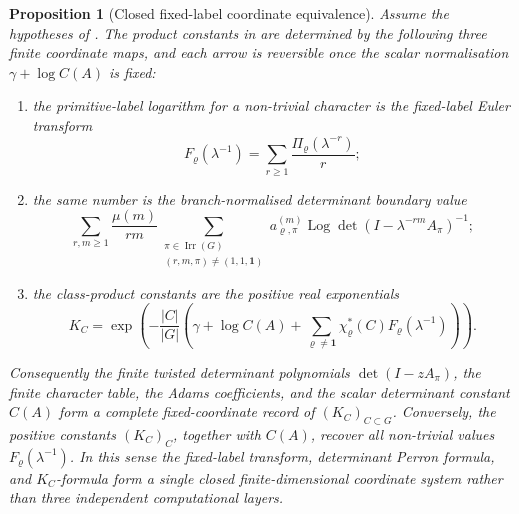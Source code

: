 \documentclass[11pt,a4paper]{amsart}
\theoremstyle{plain}
\newtheorem{proposition}[theorem]{Proposition}
\theoremstyle{definition}
\theoremstyle{remark}
\DeclareMathOperator{\Irr}{Irr}
\DeclareMathOperator{\Log}{Log}
\begin{document}
\begin{proposition}[Closed fixed-label coordinate equivalence]
  \label{prop:main-iii-fixed-label-proof-spine}
  Assume the hypotheses of .  The product
  constants in  are determined by the
  following three finite coordinate maps, and each arrow is reversible once the scalar
  normalisation \(\gamma+\log C(A)\) is fixed:
  \begin{enumerate}[label=\textup{(\roman*)},leftmargin=*]
    \item the primitive-label logarithm for a non-trivial character is the
      fixed-label Euler transform
      \[
        F_\varrho(\lambda^{-1})
        =\sum_{r\ge1}\frac{\Pi_\varrho(\lambda^{-r})}{r};
      \]
    \item the same number is the branch-normalised determinant boundary value
      \[
        \sum_{r,m\ge1}\frac{\mu(m)}{rm}
        \sum_{\substack{\pi\in\Irr(G)\\(r,m,\pi)\ne(1,1,\mathbf1)}}
          a_{\varrho,\pi}^{(m)}
          \Log\det(I-\lambda^{-rm}A_\pi)^{-1};
      \]
    \item the class-product constants are the positive real exponentials
      \[
        K_C=
        \exp\!\left(
        -\frac{|C|}{|G|}
        \left(
          \gamma+\log C(A)+
          \sum_{\varrho\ne\mathbf1}\chi_\varrho^\ast(C)
            F_\varrho(\lambda^{-1})
        \right)
        \right).
      \]
  \end{enumerate}
  Consequently the finite twisted determinant polynomials
  \(\det(I-zA_\pi)\), the finite character table, the Adams coefficients, and
  the scalar determinant constant \(C(A)\) form a complete fixed-coordinate
  record of \((K_C)_{C\subset G}\).  Conversely, the positive constants
  \((K_C)_C\), together with \(C(A)\), recover all non-trivial values
  \(F_\varrho(\lambda^{-1})\).  In this sense the fixed-label transform,
  determinant Perron formula, and \(K_C\)-formula form a single closed
  finite-dimensional coordinate system rather than three independent
  computational layers.
\end{proposition}
\end{document}
